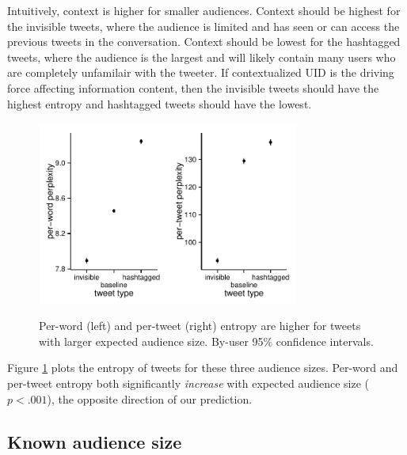 \documentclass[11pt,letterpaper]{article}
\begin{document}
Intuitively, context is higher for smaller audiences. Context should be highest for the invisible tweets, where the audience is limited and has seen or can access the previous tweets in the conversation.  Context should be lowest for the hashtagged tweets, where the audience is the largest and will likely contain many users who are completely unfamilair with the tweeter.  If contextualized UID is the driving force affecting information content, then the invisible tweets should have the highest entropy and hashtagged tweets should have the lowest.

\begin{figure}
 \centering \includegraphics[width=1.7in]{figures/cmcl-audience-pw.pdf}\includegraphics[width=1.7in]{figures/cmcl-audience-pt.pdf}
 \caption{\label{fig:audience} Per-word (left) and per-tweet (right) entropy are higher for tweets with larger expected audience size. By-user 95\% confidence intervals.}
\vspace*{-.5em}
\end{figure}

Figure \ref{fig:audience} plots the entropy of tweets for these three audience sizes.  Per-word and per-tweet entropy both significantly {\it increase} with expected audience size ($p < .001$), the opposite direction of our prediction. 

\subsection{Known audience size}
\end{document}
